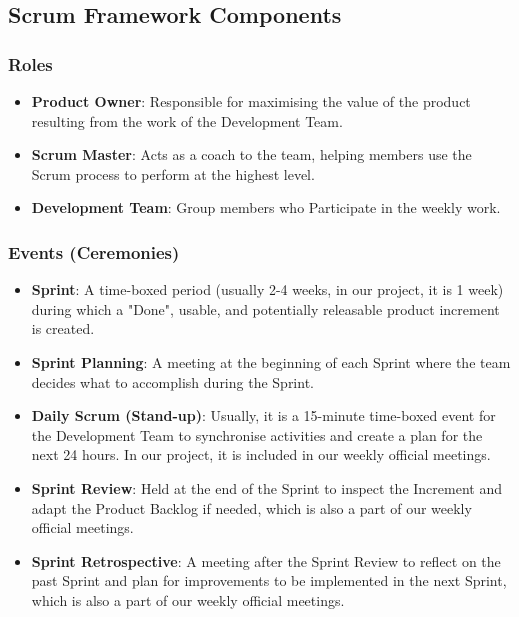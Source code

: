 \documentclass[sigconf,nonacm]{acmart}
\begin{document}
\subsection{Scrum Framework Components}
\subsubsection{Roles}
\begin{itemize}
    \item \textbf{Product Owner}: Responsible for maximising the value of the product resulting from the work of the Development Team.
    \item \textbf{Scrum Master}: Acts as a coach to the team, helping members use the Scrum process to perform at the highest level.
    \item \textbf{Development Team}: Group members who Participate in the weekly work.
\end{itemize}

\subsubsection{Events (Ceremonies)}
\begin{itemize}
    \item \textbf{Sprint}: A time-boxed period (usually 2-4 weeks, in our project, it is 1 week) during which a "Done", usable, and potentially releasable product increment is created.
    \item \textbf{Sprint Planning}: A meeting at the beginning of each Sprint where the team decides what to accomplish during the Sprint.
    \item \textbf{Daily Scrum (Stand-up)}: Usually, it is a 15-minute time-boxed event for the Development Team to synchronise activities and create a plan for the next 24 hours. In our project, it is included in our weekly official meetings.
    \item \textbf{Sprint Review}: Held at the end of the Sprint to inspect the Increment and adapt the Product Backlog if needed, which is also a part of our weekly official meetings.
    \item \textbf{Sprint Retrospective}: A meeting after the Sprint Review to reflect on the past Sprint and plan for improvements to be implemented in the next Sprint, which is also a part of our weekly official meetings.
\end{itemize}
\end{document}
